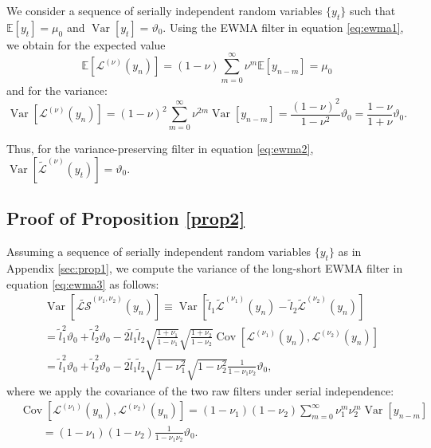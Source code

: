 \documentclass[hidelinks]{siamonline250211}
\DeclareMathOperator{\Var}{Var}
\DeclareMathOperator{\Cov}{Cov}
\begin{document}
We consider a sequence of serially independent random variables $\{y_t\}$ such that $\mathbb{E}[y_t]=\mu_{0}$ and $\Var[y_t]=\vartheta_{0}$. Using the EWMA filter in equation \eqref{eq:ewma1}, we obtain for the expected value
\begin{equation} \label{eq:e3a} 
	\mathbb{E}\left[ \mathcal{L}^{(\nu)} (y_{n}) \right]   =  \left(1-\nu \right)\sum^{\infty}_{m=0} \nu^{m} \mathbb{E}\left[y_{n-m}\right] =\mu_{0}
\end{equation}
and for the variance:
\begin{equation} \label{eq:e3c} 
	\Var\left[ \mathcal{L}^{(\nu)} (y_{n}) \right]   = \left( 1-\nu\right)^{2} \sum^{\infty}_{m=0} \nu^{2m} \Var\left[y_{n-m}\right] =   \frac{\left(1-\nu \right)^{2} }{ 1-\nu^{2}} \vartheta_{0}=   \frac{ 1-\nu   }{ 1+\nu} \vartheta_{0}.
\end{equation}

Thus, for the variance-preserving filter in equation \eqref{eq:ewma2}, $\Var[\tilde{\mathcal{L}}^{(\nu)} (y_{t})] = \vartheta_0$.






\subsection{Proof of Proposition \ref{prop2}}\label{sec:prop2}

Assuming a sequence of serially independent random variables $\{y_t\}$ as in Appendix \ref{sec:prop1}, we compute the variance of the long-short EWMA filter in equation \eqref{eq:ewma3} as follows:
\begin{equation} \label{eq:ls2} 
	\begin{split}
		& \Var\left[ \widetilde{\mathcal{LS}}^{(\nu_{1}, \nu_{2})}(y_{n})  \right] \equiv \Var\left[ \widetilde{l}_{1} \widetilde{\mathcal{L}}^{(\nu_{1})} (y_{n}) - \widetilde{l}_{2}\widetilde{\mathcal{L}}^{(\nu_{2})} (y_{n}) \right]\\
		&   = \widetilde{l}^{2}_{1}\vartheta_{0}+  \widetilde{l}^{2}_{2}\vartheta_{0} - 2  \widetilde{l}_{1}\widetilde{l}_{2}\sqrt{\frac{ 1+\nu_{1}   }{ 1-\nu_{1}}} \sqrt{\frac{ 1+\nu_{2}   }{ 1-\nu_{2}}} \Cov\left[ \mathcal{L}^{(\nu_{1})} (y_{n}),\mathcal{L}^{(\nu_{2})} (y_{n}) \right]\\
		&   = \widetilde{l}^{2}_{1}\vartheta_{0}+  \widetilde{l}^{2}_{2}\vartheta_{0} - 2  \widetilde{l}_{1}\widetilde{l}_{2}\sqrt{ 1-\nu^{2}_{1}}\sqrt{1-\nu^{2}_{2}} \frac{1}{1-\nu_{1}\nu_{2}}\vartheta_{0},
	\end{split}
\end{equation}
where we apply the covariance of the two raw filters under serial independence:
\begin{equation} \label{eq:ls3} 
	\begin{split}
		&\Cov\left[ \mathcal{L}^{(\nu_{1})} (y_{n}),\mathcal{L}^{(\nu_{2})} (y_{n}) \right]   = \left( 1-\nu_{1}\right) \left( 1-\nu_{2}\right) \sum^{\infty}_{m=0} \nu^{m}_{1} \nu^{m}_{2} \Var\left[y_{n-m}\right] \\
		& \qquad =\left( 1-\nu_{1}\right) \left( 1-\nu_{2}\right) \frac{1}{1-\nu_{1}\nu_{2}}\vartheta_{0}.
	\end{split}
\end{equation}
\end{document}
